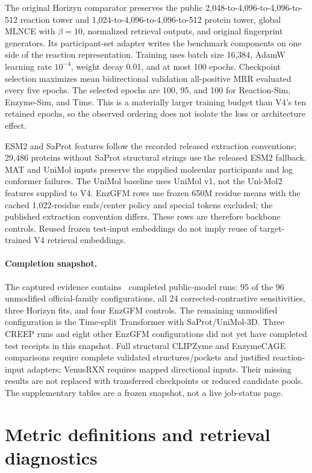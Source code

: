 The original Horizyn comparator preserves the public 2,048-to-4,096-to-4,096-to-512
reaction tower and 1,024-to-4,096-to-4,096-to-512 protein tower, global MLNCE
with $\beta=10$, normalized retrieval outputs, and original fingerprint
generators. Its participant-set adapter writes the benchmark components on
one side of the reaction representation. Training uses batch size 16,384,
AdamW learning rate $10^{-4}$, weight decay 0.01, and at most 100 epochs.
Checkpoint selection maximizes mean bidirectional validation all-positive
MRR evaluated every five epochs. The selected epochs are 100, 95, and 100
for Reaction-Sim, Enzyme-Sim, and Time. This is a materially larger training
budget than V4's ten retained epochs, so the observed ordering does not
isolate the loss or architecture effect.

ESM2 and SaProt features follow the recorded released extraction conventions;
29,486 proteins without SaProt structural strings use the released ESM2
fallback. MAT and UniMol inputs preserve the supplied molecular participants
and log conformer failures. The UniMol baseline uses UniMol v1, not the
Uni-Mol2 features supplied to V4. EnzGFM rows use frozen 650M residue means
with the cached 1,022-residue ends/center policy and special tokens excluded;
the published extraction convention differs. These rows are therefore
backbone controls. Reused frozen test-input embeddings do not imply reuse of
target-trained V4 retrieval embeddings.

\paragraph{Completion snapshot.}
The captured evidence contains \completedPublicRuns\ completed public-model
runs: 95 of the 96 unmodified official-family configurations, all 24
corrected-contrastive sensitivities, three Horizyn fits, and four EnzGFM
controls. The remaining unmodified configuration is the Time-split
Transformer with SaProt/UniMol-3D. Three CREEP runs and eight other EnzGFM
configurations did not yet have completed test receipts in this snapshot.
Full structural CLIPZyme and EnzymeCAGE comparisons require complete
validated structures/pockets and justified reaction-input adapters;
VenusRXN requires mapped directional inputs. Their missing results are
not replaced with transferred checkpoints or reduced candidate pools.
The supplementary tables are a frozen snapshot, not a live job-status page.
\FloatBarrier

\section{Metric definitions and retrieval diagnostics}
\label{app:exp-metrics}

